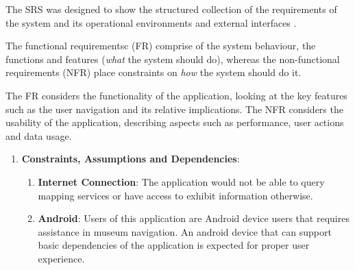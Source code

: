 

The SRS was designed to show the structured collection of the requirements of the system and its operational environments and external interfaces \cite{IEEE24765}. 

The functional requirementsc (FR) comprise of the system behaviour, the functions and features (\textit{what} the system should do), whereas the non-functional requirements (NFR) place constraints on \textit{how} the system should do it.

The FR considers the functionality of the application, looking at the key features such as the user navigation and its relative implications. The NFR considers the usability of the application, describing aspects such as performance, user actions and data usage.

\begin{enumerate}

    \item \textbf{Constraints, Assumptions and Dependencies}:
    \begin{enumerate}
        \item \textbf{Internet Connection}: The application would not be able to query mapping services or have access to exhibit information otherwise.
        \item \textbf{Android}: Users of this application are Android device users that requires assistance in museum navigation. An android device that can support basic dependencies of the application is expected for proper user experience.
    \end{enumerate}
    
\end{enumerate}